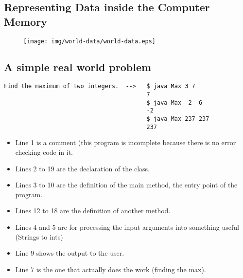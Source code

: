 \documentclass[8pt, a4paper, oneside]{extarticle}
\begin{document}
\subsection{Representing Data inside the Computer Memory}

\begin{figure}[!ht]
  \centering
  \texttt{[image: img/world-data/world-data.eps]}
\end{figure}

\subsection{A simple real world problem}

\begin{Verbatim}
Find the maximum of two integers.  -->   $ java Max 3 7
                                         7
                                         $ java Max -2 -6
                                         -2
                                         $ java Max 237 237
                                         237
\end{Verbatim}
\newpage
\begin{multicols}{2}
\columnbreak

\begin{itemize}

  \item Line 1 is a comment (this program is incomplete because there is no
    error checking code in it.

  \item Lines 2 to 19 are the declaration of the class.

  \item Lines 3 to 10 are the definition of the main method, the entry point of
    the program.

  \item Lines 12 to 18 are the definition of another method.

  \item Lines 4 and 5 are for processing the input arguments into something
    useful (Strings to ints)

  \item Line 9 shows the output to the user.

  \item Line 7 is the one that actually does the work (finding the max).

\end{itemize}

\end{multicols}
\end{document}
